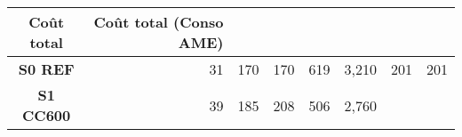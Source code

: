\begin{longtable}[]{@{}crrrrrrr@{}}
\begin{minipage}[b]{0.07\columnwidth}
Coût total\strut
\end{minipage} & \begin{minipage}[b]{0.14\columnwidth}\raggedleft\strut
Coût total (Conso AME)\strut
\end{minipage}\tabularnewline
\midrule
\endhead
\begin{minipage}[t]{0.12\columnwidth}\centering\strut
\textbf{S0 REF}\strut
\end{minipage} & \begin{minipage}[t]{0.10\columnwidth}\raggedleft\strut
31\strut
\end{minipage} & \begin{minipage}[t]{0.06\columnwidth}\raggedleft\strut
170\strut
\end{minipage} & \begin{minipage}[t]{0.13\columnwidth}\raggedleft\strut
170\strut
\end{minipage} & \begin{minipage}[t]{0.07\columnwidth}\raggedleft\strut
619\strut
\end{minipage} & \begin{minipage}[t]{0.09\columnwidth}\raggedleft\strut
3,210\strut
\end{minipage} & \begin{minipage}[t]{0.07\columnwidth}\raggedleft\strut
201\strut
\end{minipage} & \begin{minipage}[t]{0.14\columnwidth}\raggedleft\strut
201\strut
\end{minipage}\tabularnewline
\begin{minipage}[t]{0.12\columnwidth}\centering\strut
\textbf{S1 CC600}\strut
\end{minipage} & \begin{minipage}[t]{0.10\columnwidth}\raggedleft\strut
39\strut
\end{minipage} & \begin{minipage}[t]{0.06\columnwidth}\raggedleft\strut
185\strut
\end{minipage} & \begin{minipage}[t]{0.13\columnwidth}\raggedleft\strut
208\strut
\end{minipage} & \begin{minipage}[t]{0.07\columnwidth}\raggedleft\strut
506\strut
\end{minipage} & \begin{minipage}[t]{0.09\columnwidth}\raggedleft\strut
2,760\strut
\end{minipage} & \begin{minipage}[t]{0.07\columnwidth}\raggedleft\strut

\end{minipage}
\end{longtable}
